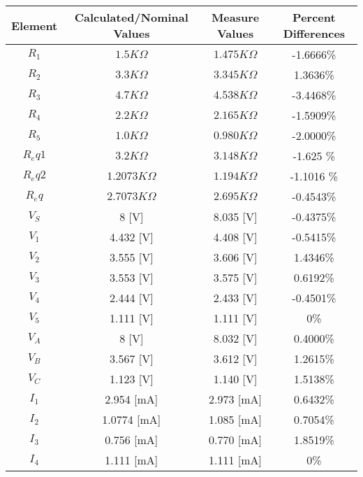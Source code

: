 \documentclass{article}
\begin{document}
\section{}



\begin{table}[h]
\begin{center}
\label{code:resis}
\begin{tabular}{c|c|c|c}
Element & Calculated/Nominal Values & Measure Values & Percent Differences 
\\\hline
$R_1$ & $1.5 K\Omega$ & $1.475 K\Omega$ & -1.6666\%  \\
$R_2$ & $3.3 K\Omega$ & $3.345 K\Omega$ &  1.3636\%  \\
$R_3$ & $4.7 K\Omega$ & $4.538 K\Omega$ &  -3.4468\%  \\
$R_4$ & $2.2 K\Omega$ & $2.165 K\Omega$ &  -1.5909\%  \\
$R_5$ & $1.0 K\Omega$ & $0.980 K\Omega$ &  -2.0000\%  \\
$R_eq1$ & $3.2 K\Omega$ & $3.148 K\Omega$ & -1.625 \%  \\
$R_eq2$ & $1.2073 K\Omega$ & $1.194 K\Omega$ & -1.1016 \%  \\
$R_eq$ & $2.7073 K\Omega$ & $2.695 K\Omega$ &  -0.4543\%  \\	\hline
$V_S$ & 8 [V] & 8.035 [V] &  -0.4375\% \\
$V_1$ & 4.432 [V] & 4.408 [V] & -0.5415\% \\
$V_2$ & 3.555 [V] & 3.606 [V] & 1.4346\% \\
$V_3$ & 3.553 [V] & 3.575 [V] &  0.6192\% \\
$V_4$ & 2.444 [V] & 2.433 [V] &  -0.4501\% \\
$V_5$ & 1.111 [V] & 1.111 [V] &  0\% \\
$V_A$ & 8 [V] & 8.032 [V] &  0.4000\% \\
$V_B$ & 3.567 [V] & 3.612 [V] &  1.2615\% \\
$V_C$ & 1.123 [V] & 1.140 [V] &  1.5138\% \\\hline
$I_1$ & 2.954 [mA] & 2.973 [mA] & 0.6432\% \\
$I_2$ & 1.0774 [mA] & 1.085 [mA] & 0.7054\% \\
$I_3$ & 0.756 [mA] & 0.770 [mA] & 1.8519\% \\
$I_4$ & 1.111 [mA] & 1.111 [mA] & 0\% \\

\end{tabular}
\end{center}

\end{table}
\end{document}
